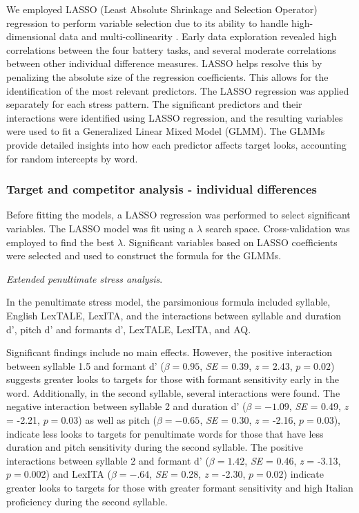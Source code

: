We employed LASSO (Least Absolute Shrinkage and Selection Operator) regression to perform variable selection due to its ability to handle high-dimensional data and multi-collinearity \citep{Zhang2020, Tibshirani1996}. Early data exploration revealed high correlations between the four battery tasks, and several moderate correlations between other individual difference measures. LASSO helps resolve this by penalizing the absolute size of the regression coefficients. This allows for the identification of the most relevant predictors. The LASSO regression was applied separately for each stress pattern. The significant predictors and their interactions were identified using LASSO regression, and the resulting variables were used to fit a Generalized Linear Mixed Model (GLMM). The GLMMs provide detailed insights into how each predictor affects target looks, accounting for random intercepts by word.


\subsubsection{Target and competitor analysis - individual differences}

Before fitting the models, a LASSO regression was performed to select significant variables. The LASSO model was fit using a $\lambda$ search space. Cross-validation was employed to find the best $\lambda$. Significant variables based on LASSO coefficients were selected and used to construct the formula for the GLMMs.

\textit{Extended penultimate stress analysis}. 

In the penultimate stress model, the parsimonious formula included syllable, English LexTALE, LexITA, and the interactions between syllable and duration d', pitch d' and formants d', LexTALE, LexITA, and AQ. 

Significant findings include no main effects. However, the positive interaction between syllable 1.5 and formant d' ($\beta= 0.95$, \textit{SE} = 0.39, \textit{z} = 2.43, $p = 0.02$) suggests greater looks to targets for those with formant sensitivity early in the word. Additionally, in the second syllable, several interactions were found. The negative interaction between syllable 2 and duration d' ($\beta= -1.09$, \textit{SE} = 0.49, \textit{z} = -2.21, $p = 0.03$) as well as pitch ($\beta= -0.65$, \textit{SE} = 0.30, \textit{z} = -2.16, $p = 0.03$), indicate less looks to targets for penultimate words for those that have less duration and pitch sensitivity during the second syllable. The positive interactions between syllable 2 and formant d' ($\beta= 1.42$, \textit{SE} = 0.46, \textit{z} = -3.13, $p = 0.002$) and LexITA ($\beta= -.64$, \textit{SE} = 0.28, \textit{z} = -2.30, $p = 0.02$) indicate greater looks to targets for those with greater formant sensitivity and high Italian proficiency during the second syllable.

